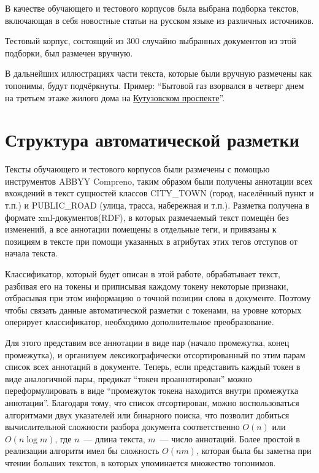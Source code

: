 \documentclass[14pt,russian]{extreport}
\begin{document}
В качестве обучающего и тестового корпусов была выбрана подборка текстов,
включающая в себя новостные статьи на русском языке из различных источников.

Тестовый корпус, состоящий из 300 случайно выбранных документов из этой
подборки, был размечен вручную.

В дальнейших иллюстрациях части текста, которые были вручную размечены как
топонимы, будут подчёркнуты.
Пример: ``Бытовой газ взорвался в четверг днем на третьем этаже жилого дома на
\underline{Кутузовском проспекте}''.

\section{Структура автоматической разметки}

Тексты обучающего и тестового корпусов были размечены с помощью инструментов
ABBYY Compreno\cite{anisimovich2012syntactic}, таким образом были получены аннотации всех вхождений в текст
сущностей классов CITY\_TOWN (город, населённый пункт и т.п.) и PUBLIC\_ROAD
(улица, трасса, набережная и т.п.). Разметка получена в формате
xml-документов(RDF), в которых размечаемый текст помещён без изменений, а все
аннотации помещены в отдельные теги, и привязаны к позициям в тексте при помощи
указанных в атрибутах этих тегов отступов от начала текста.

Классификатор, который будет описан в этой работе, обрабатывает текст, разбивая
его на токены и приписывая каждому токену некоторые признаки, отбрасывая при
этом информацию о точной позиции слова в документе. Поэтому чтобы связать
данные автоматической разметки с токенами, на уровне которых оперирует
классификатор, необходимо дополнительное преобразование.

Для этого представим все аннотации в виде пар (начало промежутка, конец
промежутка), и организуем лексикографически отсортированный по этим парам
список всех аннотаций в документе. Теперь, если представить каждый токен в виде
аналогичной пары, предикат ``токен проаннотирован'' можно переформулировать в
виде ``промежуток токена находится внутри промежутка аннотации''. Благодаря
тому, что список отсортирован, можно воспользоваться алгоритмами двух
указателей или бинарного поиска, что позволит добиться вычислительной сложности
разбора документа соответственно $O(n)$ или $O(n \log m)$, где $n$~--- длина
текста, $m$~--- число аннотаций. Более простой в реализации алгоритм имел бы
сложность $O(nm)$, которая была бы заметна при чтении больших текстов, в
которых упоминается множество топонимов.
\end{document}
